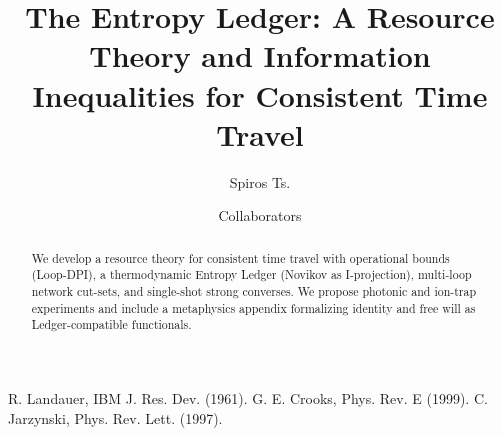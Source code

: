 \documentclass[aps,prl,twocolumn,10pt,superscriptaddress,longbibliography]{revtex4-2}
\begin{document}
\title{The Entropy Ledger: A Resource Theory and Information Inequalities for Consistent Time Travel}

\author{Spiros Ts.}
\author{Collaborators}

\begin{abstract}
We develop a resource theory for consistent time travel with operational bounds (Loop-DPI), a thermodynamic Entropy Ledger (Novikov as I-projection), multi-loop network cut-sets, and single-shot strong converses. We propose photonic and ion-trap experiments and include a metaphysics appendix formalizing identity and free will as Ledger-compatible functionals.
\end{abstract}

\maketitle










\appendix







 R. Landauer, IBM J. Res. Dev. (1961).
 G. E. Crooks, Phys. Rev. E (1999).
 C. Jarzynski, Phys. Rev. Lett. (1997).
\end{document}
